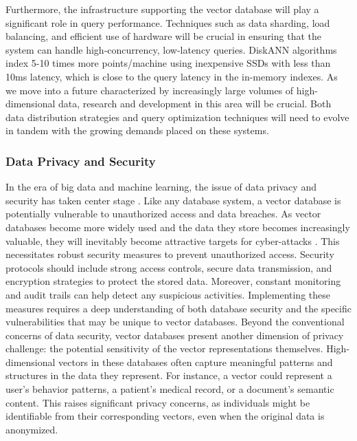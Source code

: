 Furthermore, the infrastructure supporting the vector database will play a significant role in query performance. Techniques such as data sharding, load balancing, and efficient use of hardware will be crucial in ensuring that the system can handle high-concurrency, low-latency queries. 
DiskANN algorithms \cite{NEURIPS2019_09853c7f, DBLP:journals/corr/abs-2211-12850} index 5-10 times more points/machine using inexpensive SSDs with less than 10ms latency, which is close to the query latency in the in-memory indexes.
As we move into a future characterized by increasingly large volumes of high-dimensional data, research and development in this area will be crucial. Both data distribution strategies and query optimization techniques will need to evolve in tandem with the growing demands placed on these systems.


\subsubsection{Data Privacy and Security}
In the era of big data and machine learning, the issue of data privacy and security has taken center stage \cite{DBLP:conf/trustcom/GheidC16,DBLP:conf/ccs/WangLWTZ09}. 
%
%
Like any database system, a vector database is potentially vulnerable to unauthorized access and data breaches. As vector databases become more widely used and the data they store becomes increasingly valuable, they will inevitably become attractive targets for cyber-attacks \cite{8355379}. This necessitates robust security measures to prevent unauthorized access.
Security protocols should include strong access controls, secure data transmission, and encryption strategies to protect the stored data. Moreover, constant monitoring and audit trails can help detect any suspicious activities. Implementing these measures requires a deep understanding of both database security and the specific vulnerabilities that may be unique to vector databases.
%
Beyond the conventional concerns of data security, vector databases present another dimension of privacy challenge: the potential sensitivity of the vector representations themselves. High-dimensional vectors in these databases often capture meaningful patterns and structures in the data they represent. For instance, a vector could represent a user's behavior patterns, a patient's medical record, or a document's semantic content. This raises significant privacy concerns, as individuals might be identifiable from their corresponding vectors, even when the original data is anonymized.
